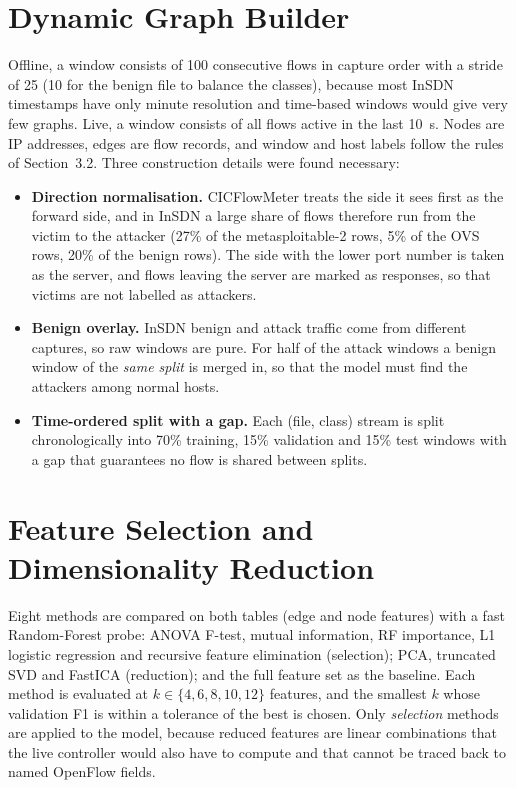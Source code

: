\section{Dynamic Graph Builder}
Offline, a window consists of 100 consecutive flows in capture order with a stride of 25 (10 for the benign file to balance the classes), because most InSDN timestamps have only minute resolution and time-based windows would give very few graphs. Live, a window consists of all flows active in the last 10~s. Nodes are IP addresses, edges are flow records, and window and host labels follow the rules of Section~3.2. Three construction details were found necessary:
\begin{itemize}
	\item \textbf{Direction normalisation.} CICFlowMeter treats the side it sees first as the forward side, and in InSDN a large share of flows therefore run from the victim to the attacker (27\% of the metasploitable-2 rows, 5\% of the OVS rows, 20\% of the benign rows). The side with the lower port number is taken as the server, and flows leaving the server are marked as responses, so that victims are not labelled as attackers.
	\item \textbf{Benign overlay.} InSDN benign and attack traffic come from different captures, so raw windows are pure. For half of the attack windows a benign window of the \emph{same split} is merged in, so that the model must find the attackers among normal hosts.
	\item \textbf{Time-ordered split with a gap.} Each (file, class) stream is split chronologically into 70\% training, 15\% validation and 15\% test windows with a gap that guarantees no flow is shared between splits.
\end{itemize}

\section{Feature Selection and Dimensionality Reduction}
Eight methods are compared on both tables (edge and node features) with a fast Random-Forest probe: ANOVA F-test, mutual information, RF importance, L1 logistic regression and recursive feature elimination (selection); PCA, truncated SVD and FastICA (reduction); and the full feature set as the baseline. Each method is evaluated at $k\in\{4,6,8,10,12\}$ features, and the smallest $k$ whose validation F1 is within a tolerance of the best is chosen. Only \emph{selection} methods are applied to the model, because reduced features are linear combinations that the live controller would also have to compute and that cannot be traced back to named OpenFlow fields.

